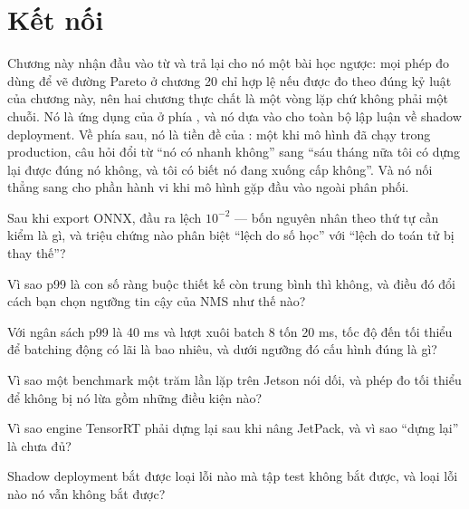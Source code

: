 \documentclass[../../deep_learning.tex]{subfiles}
\begin{document}
\section{Kết nối}
Chương này nhận đầu vào từ  và trả lại cho nó một bài học ngược: mọi phép đo dùng để vẽ đường Pareto ở chương 20 chỉ hợp lệ nếu được đo theo đúng kỷ luật của chương này, nên hai chương thực chất là một vòng lặp chứ không phải một chuỗi. Nó là ứng dụng của  ở phía , và nó dựa vào  cho toàn bộ lập luận về shadow deployment. Về phía sau, nó là tiền đề của : một khi mô hình đã chạy trong production, câu hỏi đổi từ ``nó có nhanh không'' sang ``sáu tháng nữa tôi có dựng lại được đúng nó không, và tôi có biết nó đang xuống cấp không''. Và nó nối thẳng sang  cho phần hành vi khi mô hình gặp đầu vào ngoài phân phối.

\begin{tukiem}
\item Sau khi export ONNX, đầu ra lệch $10^{-2}$ --- bốn nguyên nhân theo thứ tự cần kiểm là gì, và triệu chứng nào phân biệt ``lệch do số học'' với ``lệch do toán tử bị thay thế''?
\item Vì sao p99 là con số ràng buộc thiết kế còn trung bình thì không, và điều đó đổi cách bạn chọn ngưỡng tin cậy của NMS như thế nào?
\item Với ngân sách p99 là 40 ms và lượt xuôi batch 8 tốn 20 ms, tốc độ đến tối thiểu để batching động có lãi là bao nhiêu, và dưới ngưỡng đó cấu hình đúng là gì?
\item Vì sao một benchmark một trăm lần lặp trên Jetson nói dối, và phép đo tối thiểu để không bị nó lừa gồm những điều kiện nào?
\item Vì sao engine TensorRT phải dựng lại sau khi nâng JetPack, và vì sao ``dựng lại'' là chưa đủ?
\item Shadow deployment bắt được loại lỗi nào mà tập test không bắt được, và loại lỗi nào nó vẫn không bắt được?
\end{tukiem}
\ifSubfilesClassLoaded{\printbibliography[title={Nguồn}]}{}
\end{document}
